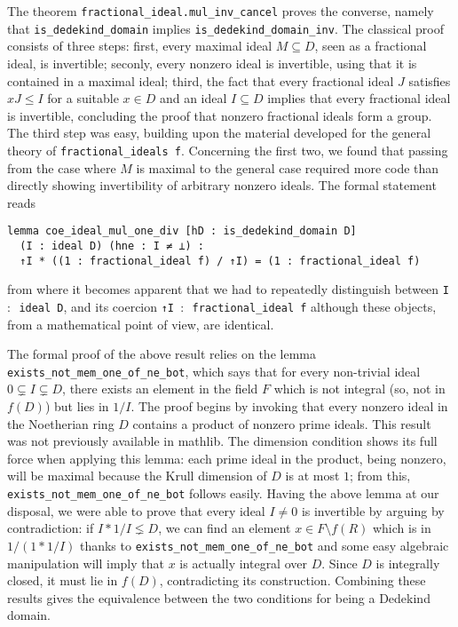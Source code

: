 \documentclass[a4paper,USenglish,cleveref, autoref, thm-restate]{lipics-v2021}
\newcommand{\lean}[1]{\texttt{#1}\xspace} %
\newcommand{\mathlib}{\textsf{mathlib}\xspace}
\begin{document}
The theorem \lean{fractional\_ideal.mul\_inv\_cancel} proves the converse, namely that \lean{is\_dedekind\_domain} implies \lean{is\_dedekind\_domain\_inv}. The classical proof consists of three steps: first, every maximal ideal $M\subseteq D$, seen as a fractional ideal, is invertible; seconly, every nonzero ideal is invertible, using that it is contained in a maximal ideal; third, the fact that every fractional ideal $J$ satisfies $xJ\leq I$ for a suitable $x\in D$ and an ideal $I\subseteq D$ implies that every fractional ideal is invertible, concluding the proof that nonzero fractional ideals form a group. The third step was easy, building upon the material developed for the general theory of \lean{fractional\_ideals f}. Concerning the first two, we found that passing from the case where $M$ is maximal to the general case required more code than directly showing invertibility of arbitrary nonzero ideals. The formal statement reads
\begin{lstlisting}
lemma coe_ideal_mul_one_div [hD : is_dedekind_domain D] 
  (I : ideal D) (hne : I ≠ ⊥) :
  ↑I * ((1 : fractional_ideal f) / ↑I) = (1 : fractional_ideal f)
\end{lstlisting}
from where it becomes apparent that we had to repeatedly distinguish between \lean{I $:$ ideal D}, and its coercion \lean{↑I $:$ fractional\_ideal f} although these objects, from a mathematical point of view, are identical.

The formal proof of the above result relies on the lemma \lean{exists\_not\_mem\_one\_of\_ne\_bot}, which says that for every non-trivial ideal $0\subsetneq I\subsetneq D$, there exists an element in the field $F$ which is not integral (so, not in $f(D)$) but lies in $1/I$. The proof begins by invoking that every nonzero ideal in the Noetherian ring $D$ contains a product of nonzero prime ideals. This result was not previously available in \mathlib. %
The dimension condition shows its full force when applying this lemma:
each prime ideal in the product, being nonzero, will be maximal because the Krull dimension of $D$ is at most $1$; from this, \lean{exists\_not\_mem\_one\_of\_ne\_bot} follows easily. Having the above lemma at our disposal,
we were able to prove that every ideal $I\ne 0$ is invertible by arguing by contradiction: if $I\ast 1/I\lneq D$, we can find an element $x\in F\setminus f(R)$ which is in $1/(1\ast 1/I)$ thanks to \lean{exists\_not\_mem\_one\_of\_ne\_bot} and some easy algebraic manipulation will imply that $x$ is actually integral over $D$. Since $D$ is integrally closed, it must lie in $f(D)$, contradicting its construction. Combining these results gives the equivalence between the two conditions for being a Dedekind domain.
\end{document}
